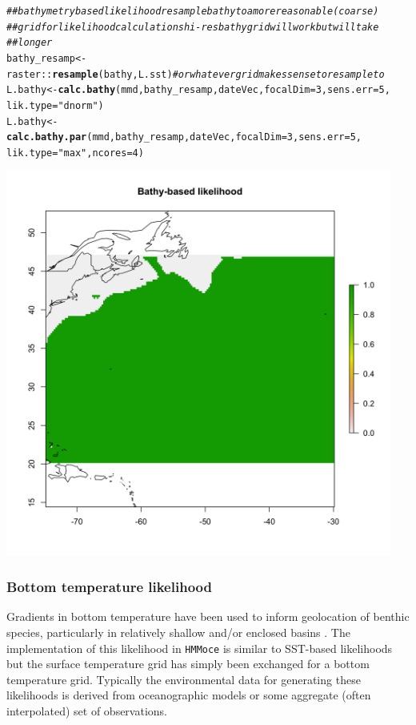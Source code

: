 \documentclass{article}\usepackage[]{graphicx}\usepackage[]{color}
\makeatletter
\newcommand{\hlnum}[1]{\textcolor[rgb]{0.686,0.059,0.569}{#1}}%
\newcommand{\hlstr}[1]{\textcolor[rgb]{0.192,0.494,0.8}{#1}}%
\newcommand{\hlcom}[1]{\textcolor[rgb]{0.678,0.584,0.686}{\textit{#1}}}%
\newcommand{\hlopt}[1]{\textcolor[rgb]{0,0,0}{#1}}%
\newcommand{\hlstd}[1]{\textcolor[rgb]{0.345,0.345,0.345}{#1}}%
\newcommand{\hlkwb}[1]{\textcolor[rgb]{0.69,0.353,0.396}{#1}}%
\newcommand{\hlkwc}[1]{\textcolor[rgb]{0.333,0.667,0.333}{#1}}%
\newcommand{\hlkwd}[1]{\textcolor[rgb]{0.737,0.353,0.396}{\textbf{#1}}}%
\newenvironment{kframe}{%
 \def\at@end@of@kframe{}%
 \ifinner\ifhmode%
  \def\at@end@of@kframe{\end{minipage}}%
  \begin{minipage}{\columnwidth}%
 \fi\fi%
 \def\FrameCommand##1{\hskip\@totalleftmargin \hskip-\fboxsep
 \colorbox{shadecolor}{##1}\hskip-\fboxsep
     \hskip-\linewidth \hskip-\@totalleftmargin \hskip\columnwidth}%
 \MakeFramed {\advance\hsize-\width
   \@totalleftmargin\z@ \linewidth\hsize
   \@setminipage}}%
 {\par\unskip\endMakeFramed%
 \at@end@of@kframe}
\newenvironment{knitrout}{}{} %
\newcommand{\eg}{\textit{e.g.} }
\makeatother
\begin{document}
\begin{knitrout}\small
{}\color{fgcolor}\begin{kframe}
\begin{alltt}
\hlcom{## bathymetry based likelihood resample bathy to a more reasonable (coarse)}
\hlcom{## grid for likelihood calculations hi-res bathy grid will work but will take}
\hlcom{## longer}
\hlstd{bathy_resamp} \hlkwb{<-} \hlstd{raster}\hlopt{::}\hlkwd{resample}\hlstd{(bathy, L.sst)}  \hlcom{# or whatever grid makes sense to resample to}
\hlstd{L.bathy} \hlkwb{<-} \hlkwd{calc.bathy}\hlstd{(mmd, bathy_resamp, dateVec,} \hlkwc{focalDim} \hlstd{=} \hlnum{3}\hlstd{,} \hlkwc{sens.err} \hlstd{=} \hlnum{5}\hlstd{,}
    \hlkwc{lik.type} \hlstd{=} \hlstr{"dnorm"}\hlstd{)}
\hlstd{L.bathy} \hlkwb{<-} \hlkwd{calc.bathy.par}\hlstd{(mmd, bathy_resamp, dateVec,} \hlkwc{focalDim} \hlstd{=} \hlnum{3}\hlstd{,} \hlkwc{sens.err} \hlstd{=} \hlnum{5}\hlstd{,}
    \hlkwc{lik.type} \hlstd{=} \hlstr{"max"}\hlstd{,} \hlkwc{ncores} \hlstd{=} \hlnum{4}\hlstd{)}
\end{alltt}
\end{kframe}
\end{knitrout}

\includegraphics[width=5in, keepaspectratio]{./example_bathy_lik.png}


\subsubsection{Bottom temperature likelihood}
Gradients in bottom temperature have been used to inform geolocation of benthic species, particularly in relatively shallow and/or enclosed basins \citep[\eg cod][]{LeBris2013}. The implementation of this likelihood in \texttt{HMMoce} is similar to SST-based likelihoods but the surface temperature grid has simply been exchanged for a bottom temperature grid. Typically the environmental data for generating these likelihoods is derived from oceanographic models or some aggregate (often interpolated) set of observations.
\end{document}
